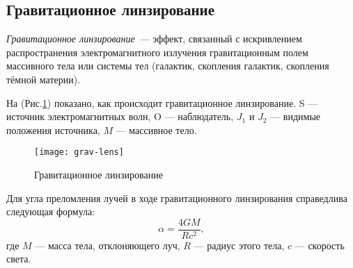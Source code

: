 \subsection{Гравитационное линзирование}

\textit{Гравитационное линзирование}~--- эффект, связанный с искривлением распространения электромагнитного излучения гравитационным полем массивного тела или системы тел (галактик, скопления галактик, скопления тёмной материи).

На (Рис.\ref{grav-lens}) показано, как происходит гравитационное линзирование. S --- источник электромагнитных волн, O --- наблюдатель, $J_1$ и $J_2$ --- видимые положения источника, $M$ --- массивное тело.

\begin{figure}[h!]
\begin{center}
\texttt{[image: grav-lens]}
\caption{Гравитационное линзирование}\label{grav-lens}
\end{center}
\end{figure}

Для угла преломления лучей в ходе гравитационного линзирования справедлива следующая формула:
\begin{equation}
\alpha=\frac{4GM}{Rc^2},
\end{equation}
где $M$ --- масса тела, отклоняющего луч, $R$ --- радиус этого тела, $c$ --- скорость света.